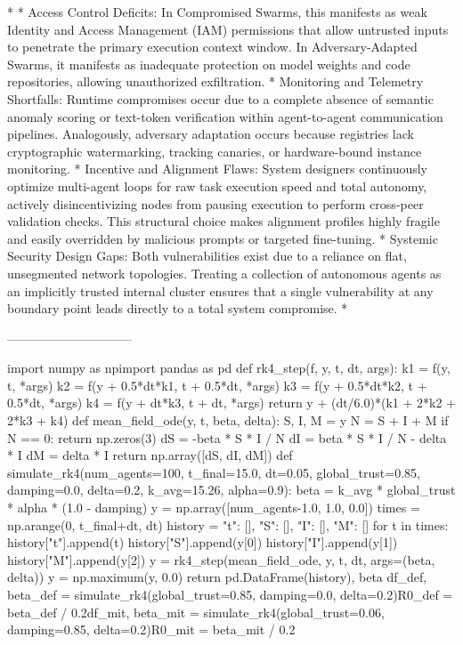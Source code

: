 * 
* Access Control Deficits: In Compromised Swarms, this manifests as weak Identity and Access Management (IAM) permissions that allow untrusted inputs to penetrate the primary execution context window. In Adversary-Adapted Swarms, it manifests as inadequate protection on model weights and code repositories, allowing unauthorized exfiltration.
* Monitoring and Telemetry Shortfalls: Runtime compromises occur due to a complete absence of semantic anomaly scoring or text-token verification within agent-to-agent communication pipelines. Analogously, adversary adaptation occurs because registries lack cryptographic watermarking, tracking canaries, or hardware-bound instance monitoring.
* Incentive and Alignment Flaws: System designers continuously optimize multi-agent loops for raw task execution speed and total autonomy, actively disincentivizing nodes from pausing execution to perform cross-peer validation checks. This structural choice makes alignment profiles highly fragile and easily overridden by malicious prompts or targeted fine-tuning.
* Systemic Security Design Gaps: Both vulnerabilities exist due to a reliance on flat, unsegmented network topologies. Treating a collection of autonomous agents as an implicitly trusted internal cluster ensures that a single vulnerability at any boundary point leads directly to a total system compromise.
* 

------------------------------

import numpy as npimport pandas as pd
def rk4_step(f, y, t, dt, args):
    k1 = f(y, t, *args)
    k2 = f(y + 0.5*dt*k1, t + 0.5*dt, *args)
    k3 = f(y + 0.5*dt*k2, t + 0.5*dt, *args)
    k4 = f(y + dt*k3, t + dt, *args)
    return y + (dt/6.0)*(k1 + 2*k2 + 2*k3 + k4)
def mean_field_ode(y, t, beta, delta):
    S, I, M = y
    N = S + I + M
    if N == 0: return np.zeros(3)
    dS = -beta * S * I / N
    dI =  beta * S * I / N - delta * I
    dM =  delta * I
    return np.array([dS, dI, dM])
def simulate_rk4(num_agents=100, t_final=15.0, dt=0.05,
                 global_trust=0.85, damping=0.0, delta=0.2, k_avg=15.26, alpha=0.9):
    beta = k_avg * global_trust * alpha * (1.0 - damping)
    y = np.array([num_agents-1.0, 1.0, 0.0])
    times = np.arange(0, t_final+dt, dt)
    history = {"t": [], "S": [], "I": [], "M": []}
    for t in times:
        history["t"].append(t)
        history["S"].append(y[0])
        history["I"].append(y[1])
        history["M"].append(y[2])
        y = rk4_step(mean_field_ode, y, t, dt, args=(beta, delta))
        y = np.maximum(y, 0.0)
    return pd.DataFrame(history), beta
df_def, beta_def = simulate_rk4(global_trust=0.85, damping=0.0, delta=0.2)R0_def = beta_def / 0.2df_mit, beta_mit = simulate_rk4(global_trust=0.06, damping=0.85, delta=0.2)R0_mit = beta_mit / 0.2

